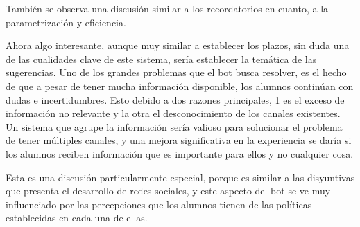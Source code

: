         \par También se observa una discusión similar a los recordatorios en cuanto, a la parametrización y eficiencia.
        \par Ahora algo interesante, aunque muy similar a establecer los plazos, sin duda una de las cualidades clave de este sistema, sería establecer la temática de las sugerencias. Uno de los grandes problemas que el bot busca resolver, es el hecho de que a pesar de tener mucha información disponible, los alumnos continúan con dudas e incertidumbres. Esto debido a dos razones principales, 1 es el exceso de información no relevante y la otra el desconocimiento de los canales existentes. Un sistema que agrupe la información sería valioso para solucionar el problema de tener múltiples canales, y una mejora significativa en la experiencia se daría si los alumnos reciben información que es importante para ellos y no cualquier cosa.
        \par Esta es una discusión particularmente especial, porque es similar a las disyuntivas que presenta el desarrollo de redes sociales, y este aspecto del bot se ve muy influenciado por las percepciones que los alumnos tienen de las políticas establecidas en cada una de ellas.


